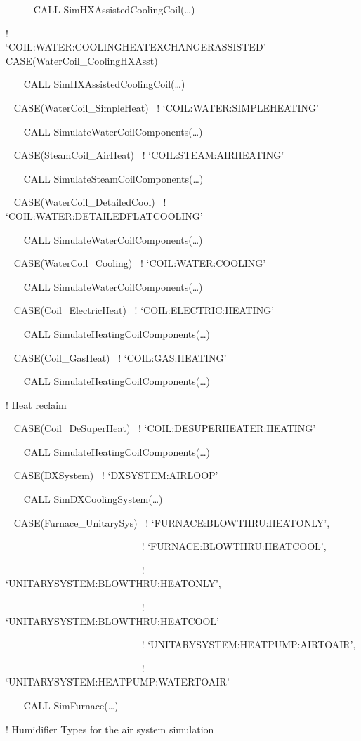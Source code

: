 ~~~~~ CALL SimHXAssistedCoolingCoil(\ldots{})

!~~~~~~~~~~~~~~~~~~~~~~~~ `COIL:WATER:COOLINGHEATEXCHANGERASSISTED'~ CASE(WaterCoil\_CoolingHXAsst)

~~~ CALL SimHXAssistedCoolingCoil(\ldots{})

~ CASE(WaterCoil\_SimpleHeat)~ ! `COIL:WATER:SIMPLEHEATING'

~~~ CALL SimulateWaterCoilComponents(\ldots{})

~ CASE(SteamCoil\_AirHeat)~ ! `COIL:STEAM:AIRHEATING'

~~~ CALL SimulateSteamCoilComponents(\ldots{})

~ CASE(WaterCoil\_DetailedCool)~ ! `COIL:WATER:DETAILEDFLATCOOLING'

~~~ CALL SimulateWaterCoilComponents(\ldots{})

~ CASE(WaterCoil\_Cooling)~ ! `COIL:WATER:COOLING'

~~~ CALL SimulateWaterCoilComponents(\ldots{})

~ CASE(Coil\_ElectricHeat)~ ! `COIL:ELECTRIC:HEATING'

~~~ CALL SimulateHeatingCoilComponents(\ldots{})

~ CASE(Coil\_GasHeat)~ ! `COIL:GAS:HEATING'

~~~ CALL SimulateHeatingCoilComponents(\ldots{})

! Heat reclaim

~ CASE(Coil\_DeSuperHeat)~ ! `COIL:DESUPERHEATER:HEATING'

~~~ CALL SimulateHeatingCoilComponents(\ldots{})

~ CASE(DXSystem)~ ! `DXSYSTEM:AIRLOOP'

~~~ CALL SimDXCoolingSystem(\ldots{})

~ CASE(Furnace\_UnitarySys)~ ! `FURNACE:BLOWTHRU:HEATONLY',

~~~~~~~~~~~~~~~~~~~~~~~~~~~ ! `FURNACE:BLOWTHRU:HEATCOOL',

~~~~~~~~~~~~~~~~~~~~~~~~~~~ ! `UNITARYSYSTEM:BLOWTHRU:HEATONLY',

~~~~~~~~~~~~~~~~~~~~~~~~~~~ ! `UNITARYSYSTEM:BLOWTHRU:HEATCOOL'

~~~~~~~~~~~~~~~~~~~~~~~~~~~ ! `UNITARYSYSTEM:HEATPUMP:AIRTOAIR',

~~~~~~~~~~~~~~~~~~~~~~~~~~~ ! `UNITARYSYSTEM:HEATPUMP:WATERTOAIR'

~~~ CALL SimFurnace(\ldots{})

! Humidifier Types for the air system simulation

